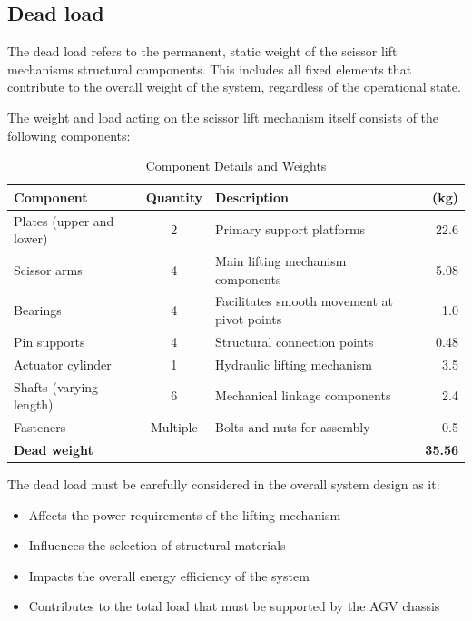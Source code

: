 \documentclass[../../main]{subfiles}
\begin{document}
\subsection{Dead load}

The dead load refers to the permanent, static weight of the scissor lift
mechanism\textquotesingle s structural components. This includes all
fixed elements that contribute to the overall weight of the system,
regardless of the operational state.

The weight and load acting on the scissor lift mechanism itself consists
of the following components:

\begin{table}[h!]
  \centering
  \begin{tcolorbox}[
    colback=red!5!white,colframe=red!75!black,
    title={\textbf{Component Details and Weights}},
    fonttitle=\bfseries, coltitle=white, width=\linewidth
]
  \begin{tabular}{|l|c|p{6cm}|r|}
    \hline \rowcolor{red!20}
    \textbf{Component} & \textbf{Quantity} & \textbf{Description} & \textbf{(kg)} \\ \hline
    Plates (upper and lower) & 2 & Primary support platforms & 22.6 \\ \hline
    Scissor arms & 4 & Main lifting mechanism components & 5.08 \\ \hline
    Bearings & 4 & Facilitates smooth movement at pivot points & 1.0 \\ \hline
    Pin supports & 4 & Structural connection points & 0.48 \\ \hline
    Actuator cylinder & 1 & Hydraulic lifting mechanism & 3.5 \\ \hline
    Shafts (varying length) & 6 & Mechanical linkage components & 2.4 \\ \hline
    Fasteners & Multiple & Bolts and nuts for assembly & 0.5 \\ \hline
    \multicolumn{3}{|l|}{\textbf{Dead weight}} & \textbf{35.56} \\ \hline
  \end{tabular}
\end{tcolorbox}
\caption{Component Details and Weights}
  \end{table}


The dead load must be carefully considered in the overall system design
as it:

\begin{itemize}
\item
  Affects the power requirements of the lifting mechanism
\item
  Influences the selection of structural materials
\item
  Impacts the overall energy efficiency of the system
\item
  Contributes to the total load that must be supported by the AGV
  chassis
\end{itemize}
\newpage
\end{document}
